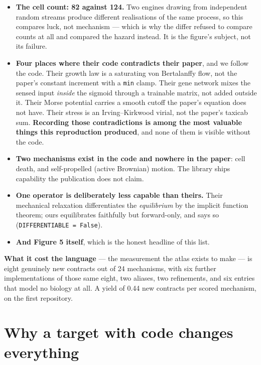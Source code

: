 \documentclass[11pt,a4paper]{article}
\newcommand{\code}[1]{\texttt{#1}}
\begin{document}
\begin{itemize}
\item \textbf{The cell count: 82 against 124.} Two engines drawing from independent random streams
produce different realisations of the same process, so this compares luck, not mechanism --- which
is why the differ refused to compare counts at all and compared the hazard instead. It is the
figure's subject, not its failure.
\item \textbf{Four places where their code contradicts their paper}, and we follow the code. Their
growth law is a saturating von Bertalanffy flow, not the paper's constant increment with a
\code{min} clamp. Their gene network mixes the sensed input \emph{inside} the sigmoid through a
trainable matrix, not added outside it. Their Morse potential carries a smooth cutoff the paper's
equation does not have. Their stress is an Irving--Kirkwood virial, not the paper's taxicab sum.
\textbf{Recording those contradictions is among the most valuable things this reproduction
produced}, and none of them is visible without the code.
\item \textbf{Two mechanisms exist in the code and nowhere in the paper}: cell death, and
self-propelled (active Brownian) motion. The library ships capability the publication does not
claim.
\item \textbf{One operator is deliberately less capable than theirs.} Their mechanical relaxation
differentiates the \emph{equilibrium} by the implicit function theorem; ours equilibrates
faithfully but forward-only, and says so (\code{DIFFERENTIABLE = False}).
\item \textbf{And Figure 5 itself}, which is the honest headline of this list.
\end{itemize}

\textbf{What it cost the language} --- the measurement the atlas exists to make --- is eight
genuinely new contracts out of 24 mechanisms, with six further implementations of those same
eight, two aliases, two refinements, and six entries that model no biology at all. A yield of 0.44
new contracts per scored mechanism, on the first repository.

\section{Why a target with code changes everything}
\end{document}
